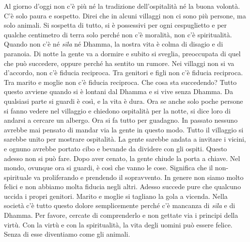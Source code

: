 Al giorno d'oggi non c'è più né la tradizione dell'ospitalità né la
buona volontà. C'è solo paura e sospetto. Direi che in alcuni villaggi
non ci sono più persone, ma solo animali. Si sospetta di tutto, si è
possessivi per ogni cespuglietto e per qualche centimetro di terra solo
perché non c'è moralità, non c'è spiritualità. Quando non c'è né
\emph{sīla} né Dhamma, la nostra vita è colma di disagio e di paranoia.
Di notte la gente va a dormire e subito si sveglia, preoccupata di quel
che può succedere, oppure perché ha sentito un rumore. Nei villaggi non
si va d'accordo, non c'è fiducia reciproca. Tra genitori e figli non c'è
fiducia reciproca. Tra marito e moglie non c'è fiducia reciproca. Che
cosa sta succedendo? Tutto questo avviene quando si è lontani dal Dhamma
e si vive senza Dhamma. Da qualsiasi parte si guardi è così, e la vita è
dura. Ora se anche solo poche persone si fanno vedere nel villaggio e
chiedono ospitalità per la notte, si dice loro di andarsi a cercare un
albergo. Ora si fa tutto per guadagno. In passato nessuno avrebbe mai
pensato di mandar via la gente in questo modo. Tutto il villaggio si
sarebbe unito per mostrare ospitalità. La gente sarebbe andata a
invitare i vicini, e ognuno avrebbe portato cibo e bevande da dividere
con gli ospiti. Questo adesso non si può fare. Dopo aver cenato, la
gente chiude la porta a chiave. Nel mondo, ovunque ora si guardi, è così
che vanno le cose. Significa che il non-spirituale va proliferando e
prendendo il sopravvento. In genere non siamo molto felici e non abbiamo
molta fiducia negli altri. Adesso succede pure che qualcuno uccida i
propri genitori. Marito e moglie si tagliano la gola a vicenda. Nella
società c'è tutto questo dolore semplicemente perché c'è mancanza di
\emph{sīla} e di Dhamma. Per favore, cercate di comprenderlo e non
gettate via i principi della virtù. Con la virtù e con la spiritualità,
la vita degli uomini può essere felice. Senza di esse diventiamo come
gli animali.

